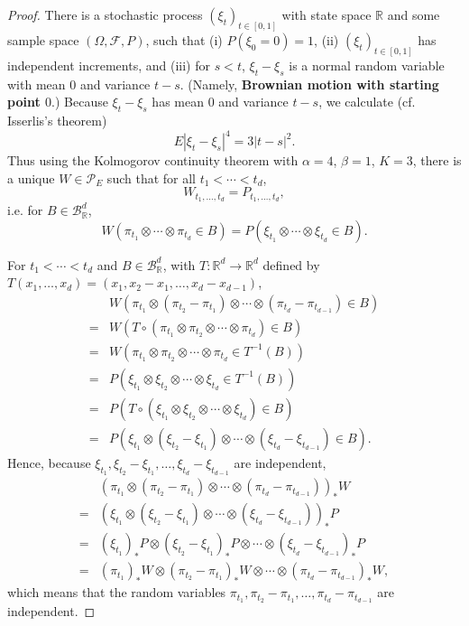 \documentclass{article}
\theoremstyle{definition}
\theoremstyle{definition}
\begin{document}
\begin{proof}
There is a stochastic process $(\xi_t)_{t \in [0,1]}$ with state space $\mathbb{R}$ and some sample space $(\Omega,\mathscr{F},P)$, 
such that (i) $P(\xi_0=0)=1$, (ii)  $(\xi_t)_{t \in [0,1]}$ has independent increments, and (iii) for $s < t$, $\xi_t-\xi_s$ is a normal
random variable with mean $0$ and variance $t-s$.
(Namely,
\textbf{Brownian motion with starting point $0$}.)
Because $\xi_t-\xi_s$ has mean $0$ and variance $t-s$, we calculate (cf. Isserlis's theorem)
\[
E|\xi_t-\xi_s|^4 = 3|t-s|^2.
\]
Thus using the Kolmogorov continuity theorem with $\alpha=4$, $\beta=1$, $K=3$, 
there is a unique $W \in \mathscr{P}_E$ such that for all $t_1<\cdots<t_d$,
\[
W_{t_1,\ldots,t_d} = P_{t_1,\ldots,t_d},
\]
i.e. for $B \in \mathscr{B}_{\mathbb{R}}^d$,
\[
W(\pi_{t_1} \otimes \cdots \otimes \pi_{t_d} \in B)
= P(\xi_{t_1} \otimes  \cdots \otimes \xi_{t_d} \in B).
\]

For $t_1<\cdots<t_d$ and $B \in \mathscr{B}_{\mathbb{R}}^d$, with $T:\mathbb{R}^d \to \mathbb{R}^d$
defined by $T(x_1,\ldots,x_d) = (x_1,x_2-x_1,\ldots,x_d-x_{d-1})$,
\[
\begin{split}
&W( \pi_{t_1} \otimes (\pi_{t_2}-\pi_{t_1}) \otimes \cdots \otimes (\pi_{t_d}-\pi_{t_{d-1}}) \in B)\\
=&W(T \circ (\pi_{t_1} \otimes \pi_{t_2} \otimes \cdots \otimes \pi_{t_d}) \in B)\\
=&W(\pi_{t_1} \otimes \pi_{t_2} \otimes \cdots \otimes \pi_{t_d} \in T^{-1}(B))\\
=&P(\xi_{t_1} \otimes \xi_{t_2} \otimes \cdots \otimes \xi_{t_d} \in T^{-1}(B))\\
=&P(T \circ (\xi_{t_1} \otimes \xi_{t_2} \otimes \cdots \otimes \xi_{t_d}) \in B)\\
=&P(\xi_{t_1} \otimes (\xi_{t_2}-\xi_{t_1}) \otimes \cdots \otimes (\xi_{t_d}-\xi_{t_{d-1}}) \in B).
\end{split}
\]
Hence, because $\xi_{t_1},\xi_{t_2}-\xi_{t_1},\ldots,\xi_{t_d}-\xi_{t_{d-1}}$ are independent,
\[
\begin{split}
&(\pi_{t_1} \otimes (\pi_{t_2}-\pi_{t_1}) \otimes \cdots \otimes (\pi_{t_d}-\pi_{t_{d-1}}))_* W\\
=&(\xi_{t_1} \otimes (\xi_{t_2}-\xi_{t_1}) \otimes \cdots \otimes (\xi_{t_d}-\xi_{t_{d-1}}))_*P\\
=&(\xi_{t_1})_*P \otimes (\xi_{t_2}-\xi_{t_1})_*P \otimes \cdots \otimes (\xi_{t_d}-\xi_{t_{d-1}})_*P\\
=&(\pi_{t_1})_*W \otimes (\pi_{t_2}-\pi_{t_1})_*W \otimes \cdots \otimes (\pi_{t_d}-\pi_{t_{d-1}})_*W,
\end{split}
\]
which means that the random variables $\pi_{t_1},\pi_{t_2}-\pi_{t_1},\ldots,\pi_{t_d}-\pi_{t_{d-1}}$ are independent. 


\end{proof}
\end{document}
